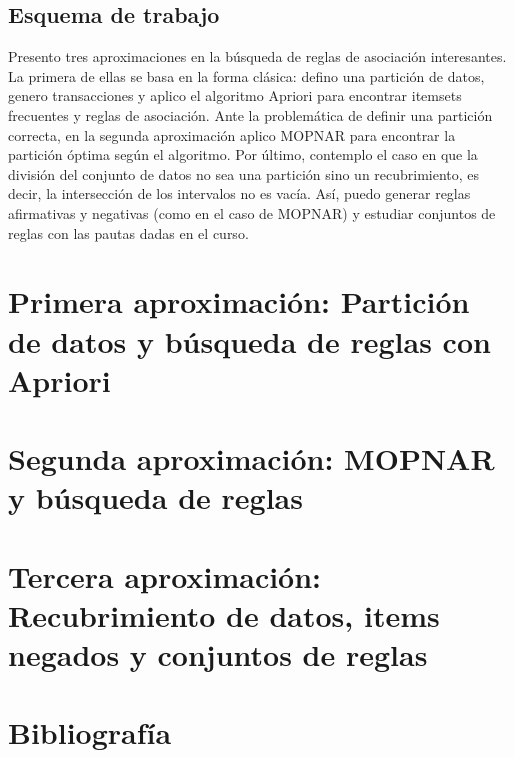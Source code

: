 \subsection{Esquema de trabajo}

Presento tres aproximaciones en la búsqueda de reglas de asociación interesantes. La primera de ellas se basa en la forma clásica: defino una partición de datos, genero transacciones y aplico el algoritmo Apriori para encontrar itemsets frecuentes y reglas de asociación. Ante la problemática de definir una partición correcta, en la segunda aproximación aplico MOPNAR para encontrar la partición óptima según el algoritmo. Por último, contemplo el caso en que la división del conjunto de datos no sea una partición sino un recubrimiento, es decir, la intersección de los intervalos no es vacía. Así, puedo generar reglas afirmativas y negativas (como en el caso de MOPNAR) y estudiar conjuntos de reglas con las pautas dadas en el curso. 

\section{Primera aproximación: Partición de datos y búsqueda de reglas con Apriori}




\section{Segunda aproximación: MOPNAR y búsqueda de reglas}



\section{Tercera aproximación: Recubrimiento de datos, items negados y conjuntos de reglas}


\newpage
\section{Bibliografía}




